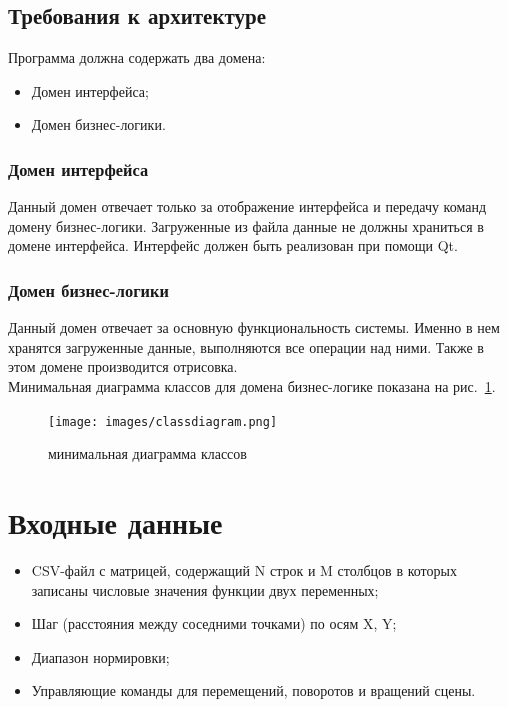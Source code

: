 \documentclass[12pt, a4paper, hidelinks]{article}
\begin{document}
\subsection{Требования к архитектуре}
\noindent Программа должна содержать два домена:
\begin{itemize}
    \item Домен интерфейса;
    \item Домен бизнес-логики.
\end{itemize}

\subsubsection{Домен интерфейса}
Данный домен отвечает только за отображение интерфейса и передачу команд домену бизнес-логики. Загруженные из файла данные не должны храниться в домене интерфейса. Интерфейс должен быть реализован при помощи Qt.

\subsubsection{Домен бизнес-логики}
Данный домен отвечает за основную функциональность системы. Именно в нем хранятся загруженные данные, выполняются все операции над ними. Также в этом домене производится отрисовка.\\
Минимальная диаграмма классов для домена бизнес-логике показана на рис.~\ref{class_diagram}.

\begin{figure}[htbp!]
	\centering
	\texttt{[image: images/classdiagram.png]}
	\caption{минимальная диаграмма классов}
	\label{class_diagram}
\end{figure}


\section{Входные данные}
\begin{itemize}
    \item CSV-файл с матрицей, содержащий N строк и M столбцов в которых записаны числовые значения функции двух переменных;
    \item Шаг (расстояния между соседними точками) по осям X, Y;
    \item Диапазон нормировки;
    \item Управляющие команды для перемещений, поворотов и вращений сцены.
\end{itemize}
\end{document}
